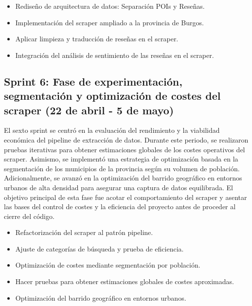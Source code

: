 \begin{itemize}
    \item Rediseño de arquitectura de datos: Separación POIs y Reseñas.
    \item Implementación del scraper ampliado a la provincia de Burgos.
    \item Aplicar limpieza y traducción de reseñas en el scraper.
    \item Integración del análisis de sentimiento de las reseñas en el scraper.
\end{itemize}

\subsection{Sprint 6: Fase de experimentación, segmentación y optimización de costes del scraper (22 de abril - 5 de mayo)}
El sexto sprint se centró en la evaluación del rendimiento y la viabilidad económica del pipeline de extracción de datos. Durante este periodo, se realizaron pruebas iterativas para obtener estimaciones globales de los costes operativos del scraper. Asimismo, se implementó una estrategia de optimización basada en la segmentación de los municipios de la provincia según su volumen de población. Adicionalmente, se avanzó en la optimización del barrido geográfico en entornos urbanos de alta densidad para asegurar una captura de datos equilibrada. El objetivo principal de esta fase fue acotar el comportamiento del scraper y asentar las bases del control de costes y la eficiencia del proyecto antes de proceder al cierre del código.

\begin{itemize}
    \item Refactorización del scraper al patrón pipeline.
    \item Ajuste de categorías de búsqueda y prueba de eficiencia.
    \item Optimización de costes mediante segmentación por población.
    \item Hacer pruebas para obtener estimaciones globales de costes aproximadas.
    \item Optimización del barrido geográfico en entornos urbanos.
\end{itemize}

